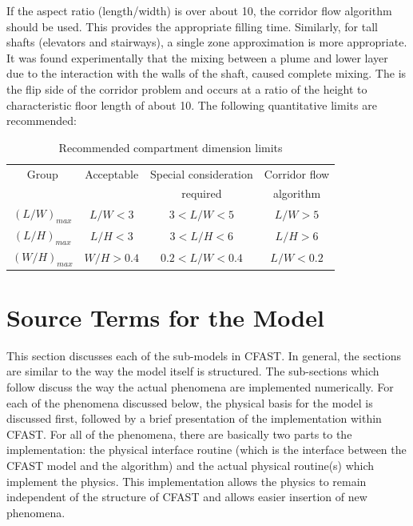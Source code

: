 If the aspect ratio (length/width) is over about 10, the corridor flow algorithm should be used.
This provides the appropriate filling time. Similarly, for tall shafts (elevators and stairways), a
single zone approximation is more appropriate. It was found experimentally \cite{Klote:1990} that the mixing
between a plume and lower layer due to the interaction with the walls of the shaft, caused
complete mixing. The is the flip side of the corridor problem and occurs at a ratio of the height
to characteristic floor length of about 10. The following quantitative limits are recommended:

\begin{table}[h]
\begin{center}
\caption{Recommended compartment dimension limits}
\label{tab:compartment_limits}
\vspace{0.1in}
\begin{tabular}{|c|c|c|c|}
\hline
Group & Acceptable & Special consideration & Corridor flow \\
 & & required & algorithm \\ \hline
$(L/W)_{max}$ & $L/W < 3$ & $3 < L/W < 5$ & $L/W > 5$ \\ \hline
$(L/H)_{max}$ &  $L/H < 3$ & $3 < L/H < 6$ & $L/H > 6$ \\ \hline
 $(W/H)_{max}$ & $W/H > 0.4$ & $0.2 < L/W < 0.4$ & $L/W < 0.2$ \\ \hline
\end{tabular}
\end{center}
\end{table}

\section{Source Terms for the Model}

This section discusses each of the sub-models in CFAST. In general, the sections are similar to
the way the model itself is structured. The sub-sections which follow discuss the way the actual
phenomena are implemented numerically. For each of the phenomena discussed below, the
physical basis for the model is discussed first, followed by a brief presentation of the
implementation within CFAST. For all of the phenomena, there are basically two parts to the
implementation: the physical interface routine (which is the interface between the CFAST
model and the algorithm) and the actual physical routine(s) which implement the physics. This
implementation allows the physics to remain independent of the structure of CFAST and allows
easier insertion of new phenomena.

